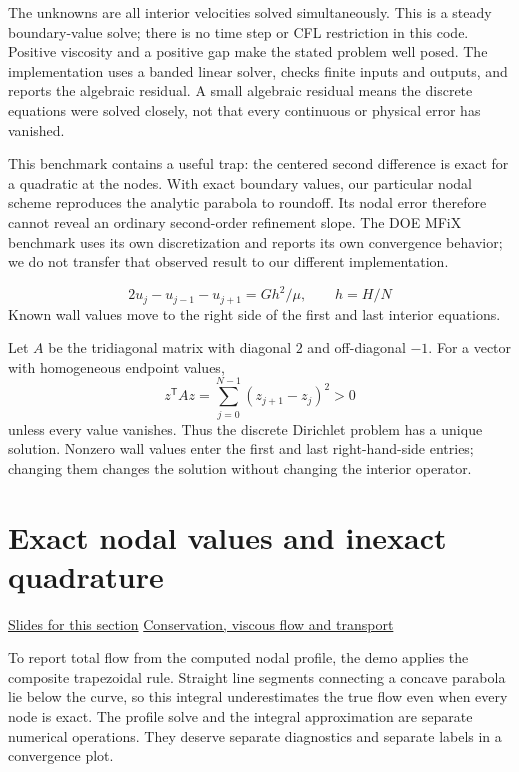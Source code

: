 \documentclass[11pt,letterpaper]{article}
\theoremstyle{definition}\newtheorem{definition}{Definition}\newtheorem{example}{Example}
\numberwithin{equation}{section}
\begin{document}
The unknowns are all interior velocities solved simultaneously. This is a steady boundary-value solve; there is no time step or CFL restriction in this code. Positive viscosity and a positive gap make the stated problem well posed. The implementation uses a banded linear solver, checks finite inputs and outputs, and reports the algebraic residual. A small algebraic residual means the discrete equations were solved closely, not that every continuous or physical error has vanished.

This benchmark contains a useful trap: the centered second difference is exact for a quadratic at the nodes. With exact boundary values, our particular nodal scheme reproduces the analytic parabola to roundoff. Its nodal error therefore cannot reveal an ordinary second-order refinement slope. The DOE MFiX benchmark uses its own discretization and reports its own convergence behavior; we do not transfer that observed result to our different implementation.

\[
2u_j-u_{j-1}-u_{j+1}=Gh^2/\mu,\qquad h=H/N
\]
Known wall values move to the right side of the first and last interior equations.

Let $A$ be the tridiagonal matrix with diagonal $2$ and off-diagonal $-1$. For a vector with homogeneous endpoint values,
\[
 z^{\mathsf T}Az=\sum_{j=0}^{N-1}(z_{j+1}-z_j)^2>0
\]
unless every value vanishes. Thus the discrete Dirichlet problem has a unique solution. Nonzero wall values enter the first and last right-hand-side entries; changing them changes the solution without changing the interior operator.
\section{Exact nodal values and inexact quadrature}
\hypertarget{note-exact-nodal-values-and-inexact-quadrature}{}\label{note:exact-nodal-values-and-inexact-quadrature}
{\small \href{slides.html\#frame=exact-differentiation-of-a-quadratic\&step=1}{Slides for this section} \quad \href{../modules/cfd/index.html}{Conservation, viscous flow and transport}}\par
To report total flow from the computed nodal profile, the demo applies the composite trapezoidal rule. Straight line segments connecting a concave parabola lie below the curve, so this integral underestimates the true flow even when every node is exact. The profile solve and the integral approximation are separate numerical operations. They deserve separate diagnostics and separate labels in a convergence plot.
\end{document}
